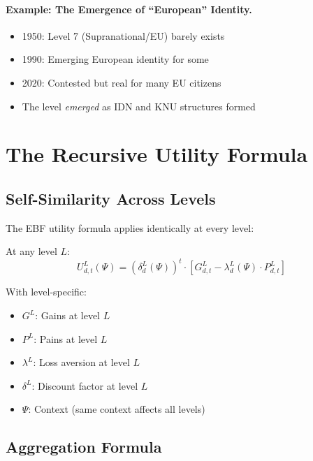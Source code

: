 \paragraph{Example: The Emergence of ``European'' Identity.}
\begin{itemize}
\item 1950: Level 7 (Supranational/EU) barely exists
\item 1990: Emerging European identity for some
\item 2020: Contested but real for many EU citizens
\item The level \emph{emerged} as IDN and KNU structures formed
\end{itemize}

\section{The Recursive Utility Formula}
\label{sec:aaa-recursive}

\subsection{Self-Similarity Across Levels}

The EBF utility formula applies identically at every level:

\begin{tcolorbox}[colback=green!5!white, colframe=green!50!black, title=Universal Utility Formula]
At any level $L$:
\begin{equation}
\boxed{
U^L_{d,t}(\Psi) = (\delta^L_d(\Psi))^t \cdot \left[ G^L_{d,t} - \lambda^L_d(\Psi) \cdot P^L_{d,t} \right]
}
\end{equation}

With level-specific:
\begin{itemize}
\item $G^L$: Gains at level $L$
\item $P^L$: Pains at level $L$
\item $\lambda^L$: Loss aversion at level $L$
\item $\delta^L$: Discount factor at level $L$
\item $\Psi$: Context (same context affects all levels)
\end{itemize}
\end{tcolorbox}

\subsection{Aggregation Formula}

